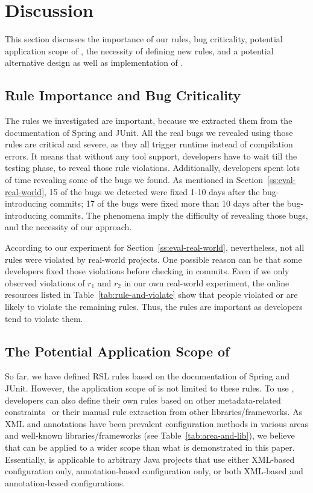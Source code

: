 {\section{Discussion}}

This section discusses the importance of our \totalRule rules, bug criticality, potential application scope of \tool, the necessity of defining new rules, and a potential alternative design as well as implementation of \tool.

\subsection{Rule Importance and Bug Criticality}

The \totalRule rules we investigated are important, because
 we extracted them from the documentation of Spring and JUnit. All the real bugs we revealed using those rules are critical and severe, as they all trigger runtime instead of compilation errors. It means that without any tool support, developers have to wait till the testing phase, to reveal those rule violations. Additionally, developers spent lots of time revealing some of the bugs we found. As mentioned in Section~\ref{ss:eval-real-world}, 15 of the bugs we detected were fixed 1-10 days after the bug-introducing commits; 17 of the bugs were fixed more than 10 days after the bug-introducing commits. The phenomena imply the difficulty of revealing those bugs, and the necessity of our approach.

According to our experiment for Section~\ref{ss:eval-real-world}, nevertheless, not all rules were violated by real-world projects. One possible reason can be that some developers fixed those violations before checking in commits.
Even if we only observed violations of $r_1$ and $r_2$ in our own real-world experiment, the online resources listed in Table~\ref{tab:rule-and-violate} show that people violated or are likely to violate the remaining rules. Thus, the rules are important as developers tend to violate them.

\vspace{-.5em}
\subsection{The Potential Application Scope of \tool}
So far, we have defined \totalRule RSL rules based on the documentation of Spring and JUnit. However, the application scope of \tool is not limited to these \totalRule rules.
To use \tool, developers can also define their own rules based on other metadata-related constraints~\cite{inspect} or their manual rule extraction from other libraries/frameworks. As XML and annotations have been prevalent configuration methods in various areas and well-known libraries/frameworks (see Table~\ref{tab:area-and-lib}), we believe that \tool can be applied to a wider scope than what is demonstrated in this paper. Essentially, \tool is applicable to arbitrary Java projects that use either XML-based configuration only, annotation-based configuration only, or both XML-based and annotation-based configurations.


